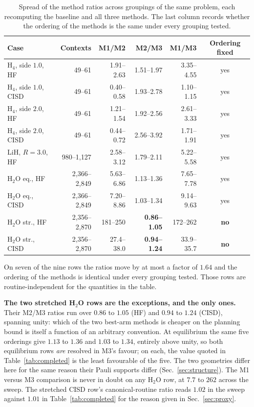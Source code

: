 \documentclass[10pt]{article}
\begin{document}
\begin{table}[!htbp]
\centering
\scriptsize
\caption{Spread of the method ratios across groupings of the same problem, each recomputing the baseline and all three methods. The last column records whether the ordering of the methods is the same under every grouping tested.}
\label{tab:routines}
\begin{tabular}{lrrrrc}
\toprule
Case & Contexts & M1/M2 & M2/M3 & M1/M3 & Ordering fixed \\
\midrule
H$_4$, side $1.0$, HF   & 49--61 & 1.91--2.63 & 1.51--1.97 & 3.35--4.55 & yes \\
H$_4$, side $1.0$, CISD & 49--61 & 0.40--0.58 & 1.93--2.78 & 1.10--1.15 & yes \\
H$_4$, side $2.0$, HF   & 49--61 & 1.21--1.54 & 1.92--2.56 & 2.61--3.33 & yes \\
H$_4$, side $2.0$, CISD & 49--61 & 0.44--0.72 & 2.56--3.92 & 1.71--1.91 & yes \\
LiH, $R{=}3.0$, HF      & 980--1,127 & 2.58--3.12 & 1.79--2.11 & 5.22--5.58 & yes \\
H$_2$O eq., HF          & 2,366--2,849 & 5.63--6.86 & 1.13--1.36 & 7.65--7.78 & yes \\
H$_2$O eq., CISD        & 2,366--2,849 & 7.20--8.86 & 1.03--1.34 & 9.14--9.63 & yes \\
H$_2$O str., HF         & 2,356--2,870 & 181--250 & \textbf{0.86--1.05} & 172--262 & \textbf{no} \\
H$_2$O str., CISD       & 2,356--2,870 & 27.4--38.0 & \textbf{0.94--1.24} & 33.9--35.7 & \textbf{no} \\
\bottomrule
\end{tabular}
\end{table}

On seven of the nine rows the ratios move by at most a factor of $1.64$ and the
ordering of the methods is identical under every grouping tested. Those rows are
routine-independent for the quantities in the table.

\textbf{The two stretched H$_2$O rows are the exceptions, and the only ones.} Their
M2/M3 ratios run over $0.86$ to $1.05$ (HF) and $0.94$ to $1.24$ (CISD), spanning
unity: which of the two best-arm methods is cheaper on the planning bound is itself
a function of an arbitrary convention. At equilibrium the same five orderings give
$1.13$ to $1.36$ and $1.03$ to $1.34$, entirely above unity, so both equilibrium
rows \emph{are} resolved in M3's favour; on each, the value quoted in
Table~\ref{tab:completed} is the least favourable of the five. The two geometries
differ here for the same reason their Pauli supports differ
(Sec.~\ref{sec:structure}). The M1 versus M3 comparison is never in doubt on any
H$_2$O row, at $7.7$ to $262$ across the sweep. The stretched CISD row's canonical-routine
ratio reads $1.02$ in the sweep against $1.01$ in Table~\ref{tab:completed} for the
reason given in Sec.~\ref{sec:proxy}.
\end{document}
